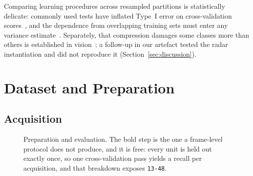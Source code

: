 \documentclass[conference]{IEEEtran}
\begin{document}
Comparing learning procedures across resampled partitions is statistically delicate: commonly used tests have inflated Type~I error on cross-validation scores~\cite{dietterich1998}, and the dependence from overlapping training sets must enter any variance estimate~\cite{nadeau2003}. Separately, that compression damages some classes more than others is established in vision~\cite{hooker2019,tran2022}; a follow-up in our artefact tested the radar instantiation and did not reproduce it (Section~\ref{sec:discussion}).
\section{Dataset and Preparation}
\label{sec:data}

\subsection{Acquisition}
\begin{figure}[t]
\centering
{}
\caption{Preparation and evaluation. The bold step is the one a frame-level protocol does not produce, and it is free: every unit is held out exactly once, so one cross-validation pass yields a recall per acquisition, and that breakdown exposes \texttt{13-48}.}
\label{fig:pipeline}
\end{figure}
\end{document}
